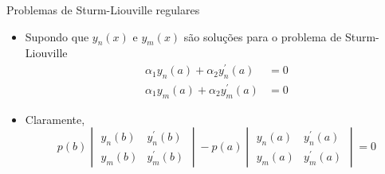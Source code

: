       \begin{slide}[toc=]{Problemas de Sturm-Liouville regulares}
	      \begin{itemize}
		      \item Supondo que $y_n(x)$ e $y_m(x)$ são soluções para o problema de Sturm-Liouville
				\begin{align*}
					\alpha_1y_n(a) + \alpha_2 y_n^\prime (a) &= 0\\
					\alpha_1y_m(a) + \alpha_2 y_m^\prime (a) &= 0
				\end{align*}
			\item Claramente,
				\begin{equation*}
					p(b)\begin{vmatrix}y_n(b) & y_n^\prime(b)\\ y_m(b) & y_m^\prime(b)\end{vmatrix}-p(a)\begin{vmatrix}y_n(a) & y_n^\prime(a)\\ y_m(a) & y_m^\prime(a)\end{vmatrix}= 0
				\end{equation*}
	      \end{itemize}
      \end{slide}
   
